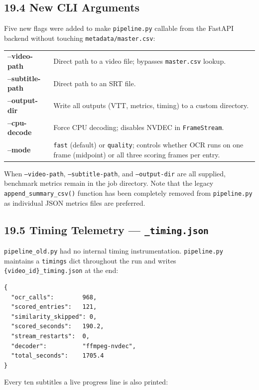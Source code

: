 \documentclass[11pt]{article}
\begin{document}
\subsection*{19.4 New CLI Arguments}

Five new flags were added to make \texttt{pipeline.py} callable from the FastAPI
backend without touching \texttt{metadata/master.csv}:

\begin{tabularx}{\textwidth}{>{\ttfamily\bfseries}l X}
--video-path     & Direct path to a video file; bypasses \texttt{master.csv} lookup. \\
--subtitle-path  & Direct path to an SRT file. \\
--output-dir     & Write all outputs (VTT, metrics, timing) to a custom directory. \\
--cpu-decode     & Force CPU decoding; disables NVDEC in \texttt{FrameStream}. \\
--mode           & \texttt{fast} (default) or \texttt{quality}; controls whether OCR
                   runs on one frame (midpoint) or all three scoring frames per entry. \\
\end{tabularx}

\medskip
When \texttt{--video-path}, \texttt{--subtitle-path}, and \texttt{--output-dir}
are all supplied, benchmark metrics remain in the job directory. Note that
the legacy \texttt{append\_summary\_csv()} function has been completely removed
from \texttt{pipeline.py} as individual JSON metrics files are preferred.

\subsection*{19.5 Timing Telemetry --- \texttt{\_timing.json}}

\texttt{pipeline\_old.py} had no internal timing instrumentation.
\texttt{pipeline.py} maintains a \texttt{timings} dict throughout the run and
writes \texttt{\{video\_id\}\_timing.json} at the end:

\begin{verbatim}
{
  "ocr_calls":        968,
  "scored_entries":   121,
  "similarity_skipped": 0,
  "scored_seconds":   190.2,
  "stream_restarts":  0,
  "decoder":          "ffmpeg-nvdec",
  "total_seconds":    1705.4
}
\end{verbatim}

\noindent Every ten subtitles a live progress line is also printed:
\end{document}
